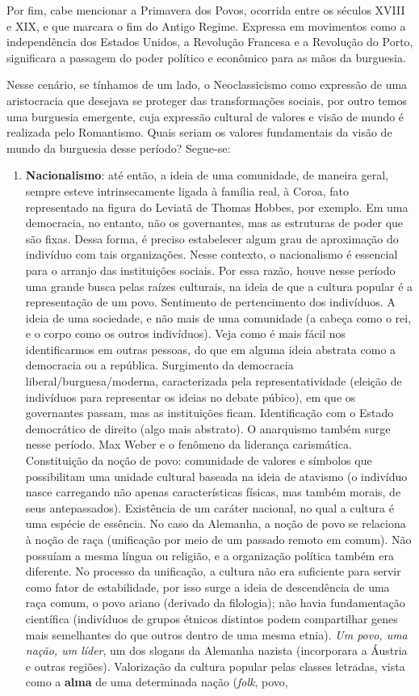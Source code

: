 \documentclass[12pt]{book}
\begin{document}
		\par Por fim, cabe mencionar a Primavera dos Povos, ocorrida entre os séculos XVIII e XIX, e que marcara o fim do Antigo Regime. Expressa em movimentos como a independência dos Estados Unidos, a Revolução Francesa e a Revolução do Porto, significara a passagem do poder político e econômico para as mãos da burguesia.
		\par Nesse cenário, se tínhamos de um lado, o Neoclassicismo como expressão de uma aristocracia que desejava se proteger das transformações sociais, por outro temos uma burguesia emergente, cuja expressão cultural de valores e visão de mundo é realizada pelo Romantismo. Quais seriam os valores fundamentais da visão de mundo da burguesia desse período? Segue-se:
		\begin{enumerate}
			\item \textbf{Nacionalismo}: até então, a ideia de uma comunidade, de maneira geral, sempre esteve intrinsecamente ligada à família real, à Coroa, fato representado na figura do Leviatã de Thomas Hobbes, por exemplo. Em uma democracia, no entanto, não os governantes, mas as estruturas de poder que são fixas. Dessa forma, é preciso estabelecer algum grau de aproximação do indivíduo com tais organizações. Nesse contexto, o nacionalismo é essencial para o arranjo das instituições sociais. Por essa razão, houve nesse período uma grande busca pelas raízes culturais, na ideia de que a cultura popular é a representação de um povo. Sentimento de pertencimento dos indivíduos. A ideia de uma sociedade, e não mais de uma comunidade (a cabeça como o rei, e o corpo como os outros indivíduos). Veja como é mais fácil nos identificarmos em outras pessoas, do que em alguma ideia abstrata como a democracia ou a república. Surgimento da democracia liberal/burguesa/moderna, caracterizada pela representatividade (eleição de indivíduos para representar os ideias no debate púbico), em que os governantes passam, mas as instituições ficam. Identificação com o Estado democrático de direito (algo mais abstrato). O anarquismo também surge nesse período. Max Weber e o fenômeno da liderança carismática. Constituição da noção de povo: comunidade de valores e símbolos que possibilitam uma unidade cultural baseada na ideia de atavismo (o indivíduo nasce carregando não apenas características físicas, mas também morais, de seus antepassados). Existência de um caráter nacional, no qual a cultura é uma espécie de essência. No caso da Alemanha, a noção de povo se relaciona à noção de raça (unificação por meio de um passado remoto em comum). Não possuíam a mesma língua ou religião, e a organização política também era diferente. No processo da unificação, a cultura não era suficiente para servir como fator de estabilidade, por isso surge a ideia de descendência de uma raça comum, o povo ariano (derivado da filologia); não havia fundamentação científica (indivíduos de grupos étnicos distintos podem compartilhar genes mais semelhantes do que outros dentro de uma mesma etnia). \textit{Um povo, uma nação, um líder}, um dos slogans da Alemanha nazista (incorporara a Áustria e outras regiões). Valorização da cultura popular pelas classes letradas, vista como a \textbf{alma} de uma determinada nação (\textit{folk}, povo, 
\end{enumerate}
\end{document}

